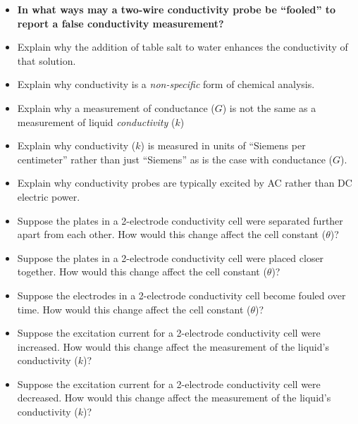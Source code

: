 \begin{itemize}
\item{} {\bf In what ways may a two-wire conductivity probe be ``fooled'' to report a false conductivity measurement?}
\item{} Explain why the addition of table salt to water enhances the conductivity of that solution.
\item{} Explain why conductivity is a {\it non-specific} form of chemical analysis.
\item{} Explain why a measurement of conductance ($G$) is not the same as a measurement of liquid {\it conductivity} ($k$)
\item{} Explain why conductivity ($k$) is measured in units of ``Siemens per centimeter'' rather than just ``Siemens'' as is the case with conductance ($G$).
\item{} Explain why conductivity probes are typically excited by AC rather than DC electric power.
\item{} Suppose the plates in a 2-electrode conductivity cell were separated further apart from each other.  How would this change affect the cell constant ($\theta$)?
\item{} Suppose the plates in a 2-electrode conductivity cell were placed closer together.  How would this change affect the cell constant ($\theta$)?
\item{} Suppose the electrodes in a 2-electrode conductivity cell become fouled over time.  How would this change affect the cell constant ($\theta$)?
\item{} Suppose the excitation current for a 2-electrode conductivity cell were increased.  How would this change affect the measurement of the liquid's conductivity ($k$)?
\item{} Suppose the excitation current for a 2-electrode conductivity cell were decreased.  How would this change affect the measurement of the liquid's conductivity ($k$)?
\end{itemize}





